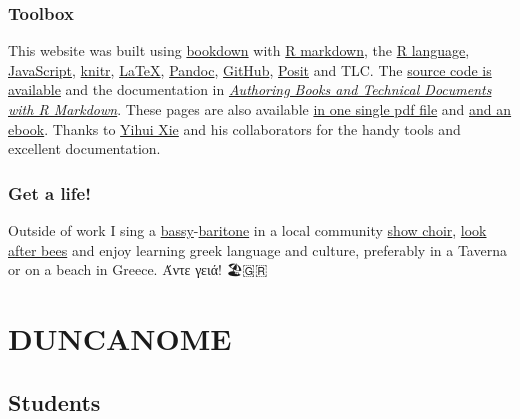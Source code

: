 \documentclass[
  12pt,
]{book}
\begin{document}
\hypertarget{toolbox}{%
\section*{Toolbox}\label{toolbox}}

This website was built using \href{https://bookdown.org}{bookdown} with \href{https://en.wikipedia.org/wiki/Markdown}{R markdown}, the \href{https://en.wikipedia.org/wiki/R_(programming_language)}{R language}, \href{https://en.wikipedia.org/wiki/JavaScript}{JavaScript}, \href{https://en.wikipedia.org/wiki/Knitr}{knitr}, \href{https://latex4year1.netlify.app}{LaTeX}, \href{https://en.wikipedia.org/wiki/Pandoc}{Pandoc}, \href{https://en.wikipedia.org/wiki/GitHub}{GitHub}, \href{https://posit.co/}{Posit} and TLC. The \href{https://github.com/dullhunk/duncanome}{source code is available} and the documentation in \emph{\href{https://bookdown.org/yihui/bookdown/}{Authoring Books and Technical Documents with R Markdown}}. These pages are also available \href{https://personalpages.manchester.ac.uk/staff/duncan.hull/duncan-hull.pdf}{in one single pdf file} and \href{https://personalpages.manchester.ac.uk/staff/duncan.hull/duncan-hull.epub}{and an ebook}. Thanks to \href{https://en.wikipedia.org/wiki/Yihui_Xie}{Yihui Xie} and his collaborators for the handy tools and excellent documentation. 🙏

\hypertarget{get-a-life}{%
\section*{Get a life!}\label{get-a-life}}

Outside of work I sing a \href{https://en.wikipedia.org/wiki/Bass_(voice_type)}{bassy}-\href{https://en.wikipedia.org/wiki/Baritone}{baritone} in a local community \href{https://en.wikipedia.org/wiki/Show_choir}{show choir}, \href{http://beelife.cs.manchester.ac.uk/}{look after bees} and enjoy learning greek language and culture, preferably in a Taverna or on a beach in Greece. Άντε γειά! 🏖️🇬🇷

\hypertarget{part-duncanome}{%
\part{DUNCANOME}\label{part-duncanome}}

\hypertarget{teaching}{%
\chapter{Students}\label{teaching}}
\end{document}
